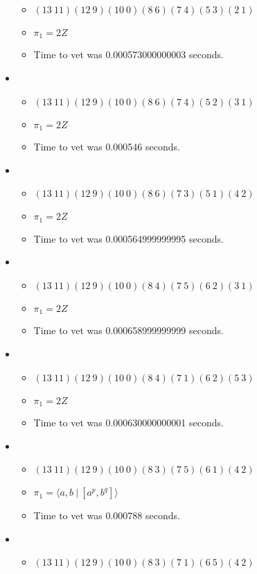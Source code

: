 \documentclass{article}
\begin{document}
\begin{itemize}
\begin{itemize}
      \item $(13\ 11)(12\ 9)(10\ 0)(8\ 6)(7\ 4)(5\ 3)(2\ 1)$
      \item $\pi_1 =2 Z$
      \item Time to vet was 0.000573000000003 seconds.
\end{itemize}
\item \begin{itemize}
      \item $(13\ 11)(12\ 9)(10\ 0)(8\ 6)(7\ 4)(5\ 2)(3\ 1)$
      \item $\pi_1 =2 Z$
      \item Time to vet was 0.000546 seconds.
\end{itemize}
\item \begin{itemize}
      \item $(13\ 11)(12\ 9)(10\ 0)(8\ 6)(7\ 3)(5\ 1)(4\ 2)$
      \item $\pi_1 =2 Z$
      \item Time to vet was 0.000564999999995 seconds.
\end{itemize}
\item \begin{itemize}
      \item $(13\ 11)(12\ 9)(10\ 0)(8\ 4)(7\ 5)(6\ 2)(3\ 1)$
      \item $\pi_1 =2 Z$
      \item Time to vet was 0.000658999999999 seconds.
\end{itemize}
\item \begin{itemize}
      \item $(13\ 11)(12\ 9)(10\ 0)(8\ 4)(7\ 1)(6\ 2)(5\ 3)$
      \item $\pi_1 =2 Z$
      \item Time to vet was 0.000630000000001 seconds.
\end{itemize}
\item \begin{itemize}
      \item $(13\ 11)(12\ 9)(10\ 0)(8\ 3)(7\ 5)(6\ 1)(4\ 2)$
      \item $\pi_1 = \langle a,b\ |\ [a^p,b^q]\rangle$
      \item Time to vet was 0.000788 seconds.
\end{itemize}
\item \begin{itemize}
      \item $(13\ 11)(12\ 9)(10\ 0)(8\ 3)(7\ 1)(6\ 5)(4\ 2)$

\end{itemize}
\end{itemize}
\end{document}
